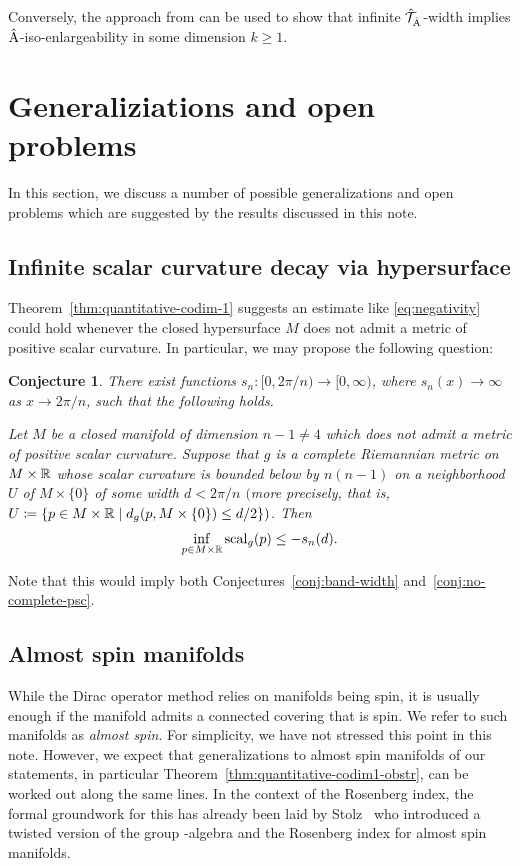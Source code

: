 \documentclass[pdftex]{sigma}
\numberwithin{equation}{section}
\newtheorem{Conjecture}[Theorem]{Conjecture}
 { \theoremstyle{definition}
\newtheorem{Definition}[Theorem]{Definition}
\newtheorem{Note}[Theorem]{Note}
\newtheorem{Example}[Theorem]{Example}
\newtheorem{Remark}[Theorem]{Remark} }
\begin{document}
\begin{Remark}
 Conversely, the approach from \cite[Section~4]{Gromov:MetricInequalitiesScalar} can be used to show that infinite \(\hat{\mathcal{T}}_{\hat{\mathrm{A}}}\)-width implies \(\hat{\mathrm{A}}\)-iso-enlargeability in some dimension \(k \geq 1\).
\end{Remark}

\section{Generaliziations and open problems} \label{sec:Problems}
In this section, we discuss a number of possible generalizations and open problems which are suggested by the results discussed in this note.
\subsection{Infinite scalar curvature decay via hypersurface}
Theorem~\ref{thm:quantitative-codim-1} suggests an estimate like \eqref{eq:negativity} could hold whenever the closed hypersurface \(M\) does not admit a metric of positive scalar curvature.
In particular, we may propose the following question:

\begin{Conjecture}
 There exist functions \(s_n \colon [0, 2 \pi/n) \to [0,\infty)\), where \(s_n(x) \to \infty\) as \(x \to 2\pi /n\), such that the following holds.

 Let \(M\) be a closed manifold of dimension \(n-1 \neq 4\) which does not admit a metric of positive scalar curvature.
 Suppose that \(g\) is a complete Riemannian metric on \(M \times \mathbb{R}\) whose scalar curvature is bounded below by \(n(n-1)\) on a neighborhood \(U\) of \(M \times \{0\}\) of some width \(d < 2\pi/n\) $($more precisely, that is, \(U \coloneqq \{p \in M \times \mathbb{R} \mid d_g(p, M \times \{0\}) \leq d/2\})\). Then
 \[
 \inf_{p \in M \times \mathbb{R}} \operatorname{scal}_g(p) \leq - s_n(d).
 \]
\end{Conjecture}
Note that this would imply both Conjectures~\ref{conj:band-width} and~\ref{conj:no-complete-psc}.

\subsection{Almost spin manifolds}
While the Dirac operator method relies on manifolds being spin, it is usually enough if the manifold admits a connected covering that is spin.
We refer to such manifolds as \emph{almost spin}.
For simplicity, we have not stressed this point in this note.
However, we expect that generalizations to almost spin manifolds of our statements, in particular Theorem~\ref{thm:quantitative-codim1-obstr}, can be worked out along the same lines.
In the context of the Rosenberg index, the formal groundwork for this has already been laid by Stolz~\cite{Stolz98Concordance} who introduced a twisted version of the group \textCstar-algebra and the Rosenberg index for almost spin manifolds.
\end{document}
